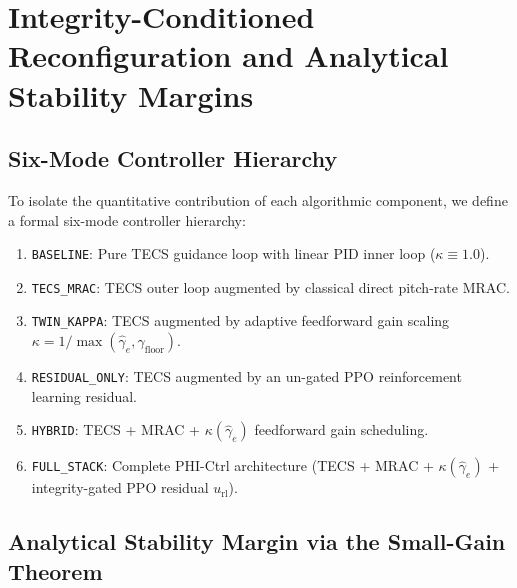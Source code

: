 \documentclass[review,12pt]{elsarticle}
\begin{document}
\section{Integrity-Conditioned Reconfiguration and Analytical Stability Margins}
\label{sec:integrity}

\subsection{Six-Mode Controller Hierarchy}
To isolate the quantitative contribution of each algorithmic component, we define a formal six-mode controller hierarchy:
\begin{enumerate}
    \item \texttt{BASELINE}: Pure TECS guidance loop with linear PID inner loop ($\kappa \equiv 1.0$).
    \item \texttt{TECS\_MRAC}: TECS outer loop augmented by classical direct pitch-rate MRAC.
    \item \texttt{TWIN\_KAPPA}: TECS augmented by adaptive feedforward gain scaling $\kappa = 1/\max(\hat{\gamma}_e, \gamma_{\text{floor}})$.
    \item \texttt{RESIDUAL\_ONLY}: TECS augmented by an un-gated PPO reinforcement learning residual.
    \item \texttt{HYBRID}: TECS + MRAC + $\kappa(\hat{\gamma}_e)$ feedforward gain scheduling.
    \item \texttt{FULL\_STACK}: Complete PHI-Ctrl architecture (TECS + MRAC + $\kappa(\hat{\gamma}_e)$ + integrity-gated PPO residual $u_{\text{rl}}$).
\end{enumerate}

\subsection{Analytical Stability Margin via the Small-Gain Theorem}
\label{sec:small_gain}
\end{document}
